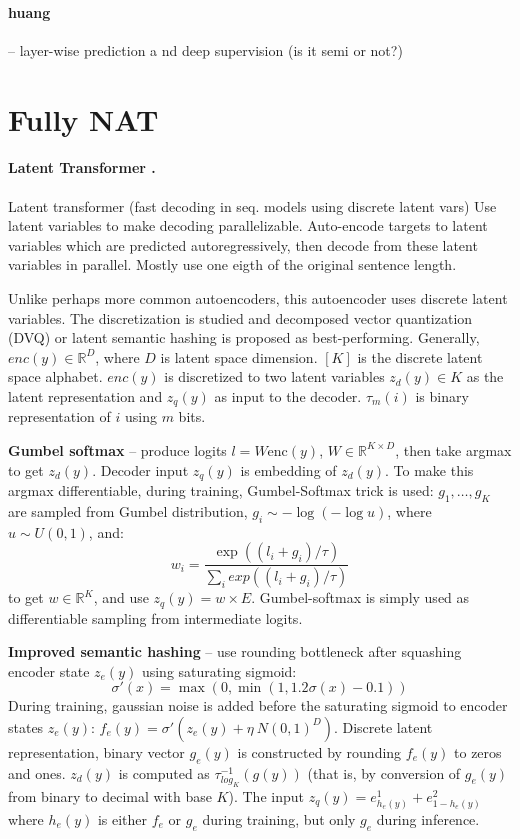 \paragraph{huang} \citep{huang-etal-2021-nonautoregressive} -- layer-wise
prediction a nd deep supervision (is it semi or not?)



\section{Fully NAT}

\paragraph{Latent Transformer \citep{kaiser2018fast}.} Latent transformer (fast
decoding in seq. models using discrete latent vars) Use latent variables to make
decoding parallelizable. Auto-encode targets to latent variables which are
predicted autoregressively, then decode from these latent variables in
parallel. Mostly use one eigth of the original sentence length.

Unlike perhaps more common autoencoders, this autoencoder uses discrete latent
variables.  The discretization is studied and decomposed vector quantization
(DVQ) or latent semantic hashing is proposed as best-performing. Generally,
$enc(y) \in \mathbb{R}^D$, where $D$ is latent space dimension. $[K]$ is the
discrete latent space alphabet. $enc(y)$ is discretized to two latent variables
$z_d(y) \in K$ as the latent representation and $z_q(y)$ as input to the
decoder. $\tau_m(i)$ is binary representation of $i$ using $m$ bits.

\textbf{Gumbel softmax} -- produce logits $l = W \text{enc}(y)$,
$W \in \mathbb{R}^{K \times D}$, then take argmax to get $z_d(y)$. Decoder input
$z_q(y)$ is embedding of $z_d(y)$. To make this argmax differentiable, during
training, Gumbel-Softmax trick is used: $g_1, \ldots, g_K$ are sampled from
Gumbel distribution, $g_i \sim -\log(-\log u)$, where $u \sim U(0,1)$, and:
\begin{equation}
  w_i= \frac{\exp((l_i + g_i) / \tau) }{\sum_i exp((l_i + g_i)/\tau)}
\end{equation}
to get $w \in \mathbb{R}^K$, and use $z_q(y) = w \times E$. Gumbel-softmax is
simply used as differentiable sampling from intermediate logits.

\textbf{Improved semantic hashing} -- use rounding bottleneck after squashing
encoder state $z_e(y)$ using saturating sigmoid:
\begin{equation}
  \sigma'(x) = \max(0, \min(1, 1.2 \sigma(x) - 0.1))
\end{equation}
During training, gaussian noise is added before the saturating sigmoid to
encoder states $z_e(y)$: $f_e(y) = \sigma'(z_e(y) + \eta ~ N(0,1)^D)$. Discrete
latent representation, binary vector $g_e(y)$ is constructed by rounding
$f_e(y)$ to zeros and ones. $z_d(y)$ is computed as $\tau^{-1}_{log_K}(g(y))$
(that is, by conversion of $g_e(y)$ from binary to decimal with base $K$). The
input $z_q(y) = e^1_{h_e(y)} + e^2_{1-h_e(y)}$ where $h_e(y)$ is either $f_e$ or
$g_e$ during training, but only $g_e$ during inference.

